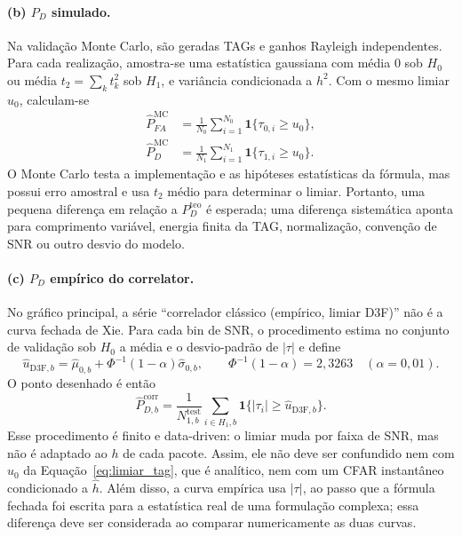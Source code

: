 \documentclass[12pt,a4paper]{article}
\begin{document}
\paragraph{(b) $P_D$ simulado.}
Na validação Monte Carlo, são geradas TAGs e ganhos Rayleigh independentes. Para cada realização, amostra-se uma estatística gaussiana com média $0$ sob $H_0$ ou média $t_2=\sum_k t_k^2$ sob $H_1$, e variância condicionada a $h^2$. Com o mesmo limiar $u_0$, calculam-se
\begin{align}
    \widehat{P}_{FA}^{\mathrm{MC}}&=\frac{1}{N_0}
    \sum_{i=1}^{N_0}\mathbf{1}\{\tau_{0,i}\geq u_0\},\\
    \widehat{P}_{D}^{\mathrm{MC}}&=\frac{1}{N_1}
    \sum_{i=1}^{N_1}\mathbf{1}\{\tau_{1,i}\geq u_0\}.
    \label{eq:pd_mc}
\end{align}
O Monte Carlo testa a implementação e as hipóteses estatísticas da fórmula, mas possui erro amostral e usa $t_2$ médio para determinar o limiar. Portanto, uma pequena diferença em relação a $P_D^{\mathrm{teo}}$ é esperada; uma diferença sistemática aponta para comprimento variável, energia finita da TAG, normalização, convenção de SNR ou outro desvio do modelo.

\paragraph{(c) $P_D$ empírico do correlator.}
No gráfico principal, a série ``correlador clássico (empírico, limiar D3F)'' não é a curva fechada de Xie. Para cada bin de SNR, o procedimento estima no conjunto de validação sob $H_0$ a média e o desvio-padrão de $|\tau|$ e define
\begin{equation}
    \widehat{u}_{\mathrm{D3F},b}=\widehat{\mu}_{0,b}
    +\Phi^{-1}(1-\alpha)\widehat{\sigma}_{0,b},
    \qquad \Phi^{-1}(1-\alpha)=2{,}3263\quad(\alpha=0{,}01).
    \label{eq:threshold_classical_d3f}
\end{equation}
O ponto desenhado é então
\begin{equation}
    \widehat{P}_{D,b}^{\mathrm{corr}}=\frac{1}{N_{1,b}^{\mathrm{test}}}
    \sum_{i\in H_1,b}\mathbf{1}\{|\tau_i|\geq\widehat{u}_{\mathrm{D3F},b}\}.
    \label{eq:pd_classical_emp}
\end{equation}
Esse procedimento é finito e data-driven: o limiar muda por faixa de SNR, mas não é adaptado ao $h$ de cada pacote. Assim, ele não deve ser confundido nem com $u_0$ da Equação~\eqref{eq:limiar_tag}, que é analítico, nem com um CFAR instantâneo condicionado a $\hat h$. Além disso, a curva empírica usa $|\tau|$, ao passo que a fórmula fechada foi escrita para a estatística real de uma formulação complexa; essa diferença deve ser considerada ao comparar numericamente as duas curvas.
\end{document}
